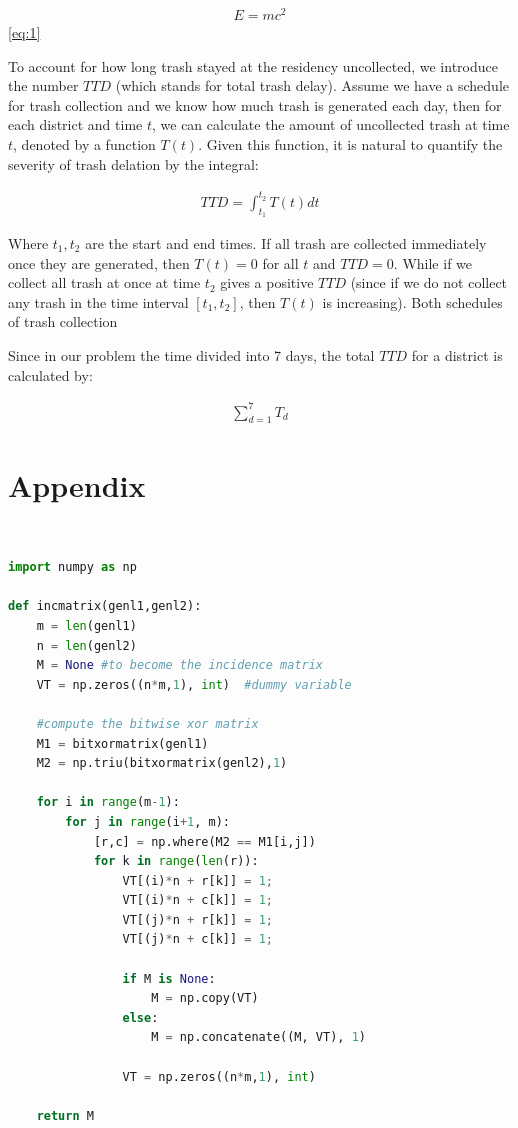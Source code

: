 \documentclass[20pt]{article}
\theoremstyle{definition}
\begin{document}
\begin{align}
	E = mc^2 \label{eq:1}
\end{align}
\cref{eq:1}

To account for how long trash stayed at the residency uncollected, we introduce the number $ TTD$ (which stands for total trash delay). Assume we have a schedule for trash collection and we know how much trash is generated each day, then for each district and time $ t$, we can calculate the amount of uncollected trash at time $ t$, denoted by a function $ T(t)$. Given this function, it is natural to quantify the severity of trash delation by the integral:

\begin{align}
	TTD = \int_{t_1}^{t_2} T(t) dt \label{eq:ttd}
\end{align}

Where $ t_1,t_2$ are the start and end times. If all trash are collected immediately once they are generated, then $ T(t) = 0$ for all $ t$ and $ TTD = 0$. While if we collect all trash at once at time $ t_2$ gives a positive $ TTD$ (since if we do not collect any trash in the time interval $ [t_1,t_2]$, then $ T(t)$ is increasing). Both schedules of trash collection 


Since in our problem the time divided into 7 days, the total $ TTD$ for a district is calculated by:


\begin{align}
\sum_{d = 1}^{7} T_d	
\end{align}

\newpage

\section  {Appendix} \ 
\begin{lstlisting}[language=Python, caption=Python example]
import numpy as np
    
def incmatrix(genl1,genl2):
    m = len(genl1)
    n = len(genl2)
    M = None #to become the incidence matrix
    VT = np.zeros((n*m,1), int)  #dummy variable
    
    #compute the bitwise xor matrix
    M1 = bitxormatrix(genl1)
    M2 = np.triu(bitxormatrix(genl2),1) 

    for i in range(m-1):
        for j in range(i+1, m):
            [r,c] = np.where(M2 == M1[i,j])
            for k in range(len(r)):
                VT[(i)*n + r[k]] = 1;
                VT[(i)*n + c[k]] = 1;
                VT[(j)*n + r[k]] = 1;
                VT[(j)*n + c[k]] = 1;
                
                if M is None:
                    M = np.copy(VT)
                else:
                    M = np.concatenate((M, VT), 1)
                
                VT = np.zeros((n*m,1), int)
    
    return M
\end{lstlisting}

\newpage
\printbibliography
\end{document}
